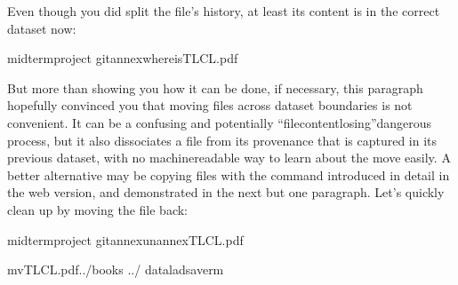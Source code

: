 \sphinxAtStartPar
Even though you did split the file’s history, at least its content is in the
correct dataset now:

\begin{sphinxVerbatim}[commandchars=\\\{\}]
midterm\PYGZus{}project
gitannexwhereisTLCL.pdf
\end{sphinxVerbatim}

\sphinxAtStartPar
But more than showing you how it can be done, if necessary, this paragraph
hopefully convinced you that moving files across dataset boundaries is not
convenient. It can be a confusing and potentially “file\sphinxhyphen{}content\sphinxhyphen{}losing”\sphinxhyphen{}dangerous
process, but it also dissociates a file from its provenance that is captured
in its previous dataset, with no machine\sphinxhyphen{}readable way to learn about the move
easily. A better alternative may be copying files with the 
command introduced in detail in the web version, and demonstrated in the next
but one paragraph. Let’s quickly clean up by moving the file back:

\begin{sphinxVerbatim}[commandchars=\\\{\}]
midterm\PYGZus{}project
gitannexunannexTLCL.pdf
\end{sphinxVerbatim}

\begin{sphinxVerbatim}[commandchars=\\\{\}]
mvTLCL.pdf../books
../
dataladsave\PYGZhy{}r\PYGZhy{}m
\end{sphinxVerbatim}


